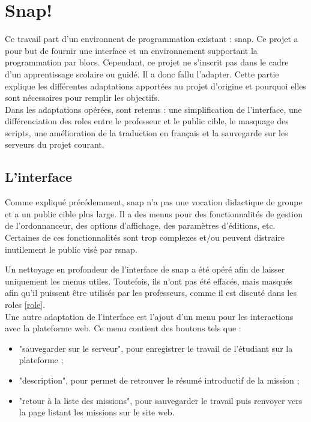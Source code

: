 \section{Snap!}
\label{solution SNAP}
Ce travail part d'un environnent de programmation existant : \gls{snap}. Ce projet a pour but de fournir une interface et un environnement supportant la programmation par \glspl{bloc}. Cependant, ce projet ne s'inscrit pas dans le cadre d'un apprentissage scolaire ou guidé. Il a donc fallu l'adapter. Cette partie explique les différentes adaptations apportées au projet d'origine et pourquoi elles sont nécessaires pour remplir les objectifs.\\

Dans les adaptations opérées, sont retenus : une simplification de l'interface, une différenciation des \glspl{role} entre le professeur et le public cible, le masquage des \glspl{script}, une amélioration de la traduction en français et la sauvegarde sur les serveurs du projet courant.

\subsection{L'interface}
\label{interface}
Comme expliqué précédemment, \gls{snap} n'a pas une vocation didactique de groupe et a un public cible plus large. Il a des menus pour des fonctionnalités de gestion de l'ordonnanceur, des options d'affichage, des paramètres d'éditions, etc. Certaines de ces fonctionnalités sont trop complexes et/ou peuvent distraire inutilement le public visé par \gls{rsnap}.

Un nettoyage en profondeur de l'interface de \gls{snap} a été opéré afin de laisser uniquement les menus utiles. Toutefois, ils n'ont pas été effacés, mais masqués afin qu'il puissent être utilisés par les professeurs, comme il est discuté dans les \glspl{role} \ref{role}.\\

Une autre adaptation de l'interface est l'ajout d'un menu pour les interactions avec la plateforme web. Ce menu contient des boutons tels que :
\begin{itemize}
  \item "sauvegarder sur le serveur", pour enregistrer le travail de l'étudiant sur la plateforme ;
  \item "description", pour permet de retrouver le résumé introductif de la \gls{mission} ;
  \item "retour à la liste des missions", pour sauvegarder le travail puis renvoyer vers la page listant les \glspl{mission} sur le site web.
\end{itemize}

